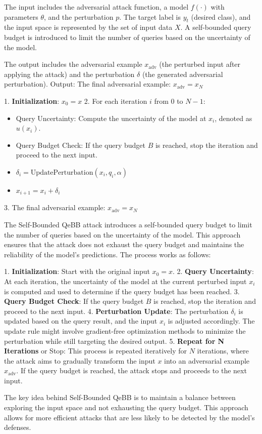 The input includes the adversarial attack function, a model $f(\cdot)$ with parameters $\theta$, and the perturbation $p$. 
The target label is $y_t$ (desired class), and the input space is represented by the set of input data $X$. 
A self-bounded query budget is introduced to limit the number of queries based on the uncertainty of the model.

The output includes the adversarial example $x_{\text{adv}}$ (the perturbed input after applying the attack) and the perturbation $\delta$ (the generated adversarial perturbation).
Output: The final adversarial example:
$x_{\text{adv}} = x_N$

1. \textbf{Initialization}:
   $x_0 = x$
2. For each iteration $i$ from 0 to $N-1$:
   \begin{itemize}
   \item Query Uncertainty: Compute the uncertainty of the model at $x_i$, denoted as $u(x_i)$.
   \item Query Budget Check: If the query budget $B$ is reached, stop the iteration and proceed to the next input.
   \item $\delta_i = \text{UpdatePerturbation}(x_i, q_i, \alpha)$
   \item $x_{i+1} = x_i + \delta_i$
   \end{itemize}
3. The final adversarial example:
$x_{\text{adv}} = x_N$

The Self-Bounded QeBB attack introduces a self-bounded query budget to limit the number of queries based on the uncertainty of the model. This approach ensures that the attack does not exhaust the query budget and maintains the reliability of the model's predictions. The process works as follows:

1. \textbf{Initialization}: Start with the original input $x_0 = x$.
2. \textbf{Query Uncertainty}: At each iteration, the uncertainty of the model at the current perturbed input $x_i$ is computed and used to determine if the query budget has been reached.
3. \textbf{Query Budget Check}: If the query budget $B$ is reached, stop the iteration and proceed to the next input.
4. \textbf{Perturbation Update}: The perturbation $\delta_i$ is updated based on the query result, and the input $x_i$ is adjusted accordingly. The update rule might involve gradient-free optimization methods to minimize the perturbation while still targeting the desired output.
5. \textbf{Repeat for N Iterations} or Stop: This process is repeated iteratively for $N$ iterations, where the attack aims to gradually transform the input $x$ into an adversarial example $x_{\text{adv}}$. If the query budget is reached, the attack stops and proceeds to the next input.

The key idea behind Self-Bounded QeBB is to maintain a balance between exploring the input space and not exhausting the query budget. This approach allows for more efficient attacks that are less likely to be detected by the model's defenses.